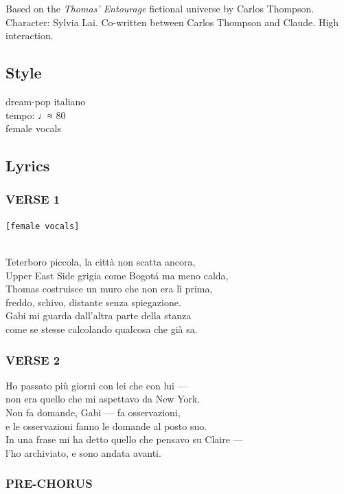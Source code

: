 Based on the \emph{Thomas' Entourage} fictional universe by Carlos
Thompson. Character: Sylvia Lai. Co-written between Carlos Thompson and
Claude. High interaction.

\subsection{Style}\label{style-15}

dream-pop italiano\\
tempo: ♩≈ 80\\
female vocals

\subsection{Lyrics}\label{lyrics-15}

\subsubsection{VERSE 1}\label{verse-1-11}

\texttt{{[}female\ vocals{]}}\strut \\
Teterboro piccola, la città non scatta ancora,\\
Upper East Side grigia come Bogotá ma meno calda,\\
Thomas costruisce un muro che non era lì prima,\\
freddo, schivo, distante senza spiegazione.\\
Gabi mi guarda dall'altra parte della stanza\\
come se stesse calcolando qualcosa che già sa.

\subsubsection{VERSE 2}\label{verse-2-11}

Ho passato più giorni con lei che con lui ---\\
non era quello che mi aspettavo da New York.\\
Non fa domande, Gabi --- fa osservazioni,\\
e le osservazioni fanno le domande al posto suo.\\
In una frase mi ha detto quello che pensavo su Claire ---\\
l'ho archiviato, e sono andata avanti.

\subsubsection{PRE-CHORUS}\label{pre-chorus-26}


